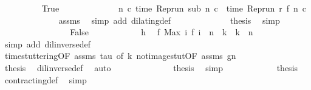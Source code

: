 \begin{isabellebody}
\ \ \ \ \ \ \ \ \isamarkupfalse%
\ True\isanewline
\ \ \ \ \ \ \ \ \ \ \isamarkupfalse%
\ \isamarkupfalse%
\ {\isacartoucheopen}{\isasymforall}n\ c{\isachardot}\ time\ {\isacharparenleft}Rep{\isacharunderscore}run\ sub\ n\ c{\isacharparenright}\ {\isacharequal}\ time\ {\isacharparenleft}Rep{\isacharunderscore}run\ r\ {\isacharparenleft}f\ n{\isacharparenright}\ c{\isacharparenright}{\isacartoucheclose}\isanewline
\ \ \ \ \ \ \ \ \ \ \ \ \isamarkupfalse%
\ assms\ \isamarkupfalse%
\ {\isacharparenleft}simp\ add{\isacharcolon}\ dilating{\isacharunderscore}def{\isacharparenright}\isanewline
\ \ \ \ \ \ \ \ \ \ \isamarkupfalse%
\ \isamarkupfalse%
\ {\isacharquery}thesis\ \isamarkupfalse%
\ simp\isanewline
\ \ \ \ \ \ \isamarkupfalse%
\isanewline
\ \ \ \ \ \ \ \ \isamarkupfalse%
\ False\isanewline
\ \ \ \ \ \ \ \ \ \ \isamarkupfalse%
\ h\ \isamarkupfalse%
\ {\isacartoucheopen}f\ {\isacharparenleft}Max\ {\isacharbraceleft}i{\isachardot}\ f\ i\ {\isasymle}\ n{\isacharbraceright}{\isacharparenright}\ {\isacharless}\ k\ {\isasymand}\ k\ {\isasymle}\ n{\isacartoucheclose}\ \isamarkupfalse%
\ {\isacharparenleft}simp\ add{\isacharcolon}\ dil{\isacharunderscore}inverse{\isacharunderscore}def{\isacharparenright}\isanewline
\ \ \ \ \ \ \ \ \ \ \isamarkupfalse%
\ time{\isacharunderscore}stuttering{\isacharbrackleft}OF\ assms\ tau{\isacharcomma}\ of\ k{\isacharbrackright}\ not{\isacharunderscore}image{\isacharunderscore}stut{\isacharbrackleft}OF\ assms\ gn{\isacharbrackright}\isanewline
\ \ \ \ \ \ \ \ \ \ \ \ \isamarkupfalse%
\ {\isacharquery}thesis\ \isamarkupfalse%
\ dil{\isacharunderscore}inverse{\isacharunderscore}def\ \isamarkupfalse%
\ auto\isanewline
\ \ \ \ \ \ \isamarkupfalse%
\isanewline
\ \ \ \ \isacommand{{\isacharbraceright}}\isamarkupfalse%
\ \isamarkupfalse%
\ {\isacharquery}thesis\ \isamarkupfalse%
\ simp\isanewline
\ \ \isamarkupfalse%
\isanewline
\isanewline
\ \ \isamarkupfalse%
\ {\isacharasterisk}\ {}\ {}\ {}\ \isamarkupfalse%
\ {\isacharquery}thesis\ \isamarkupfalse%
\ contracting{\isacharunderscore}def\ \isamarkupfalse%
\ simp\isanewline
{}\isamarkupfalse%
%
\endisatagproof
{\isafoldproof}%

\end{isabellebody}
